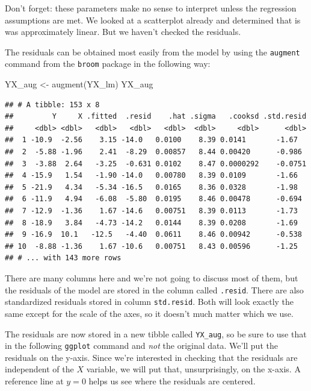 \documentclass[
]{book}
\newenvironment{Shaded}{\begin{snugshade}}{\end{snugshade}}
\newcommand{\FunctionTok}[1]{\textcolor[rgb]{0.00,0.00,0.00}{#1}}
\newcommand{\NormalTok}[1]{#1}
\newcommand{\OtherTok}[1]{\textcolor[rgb]{0.56,0.35,0.01}{#1}}
\begin{document}
Don't forget: these parameters make no sense to interpret unless the regression assumptions are met. We looked at a scatterplot already and determined that is was approximately linear. But we haven't checked the residuals.

The residuals can be obtained most easily from the model by using the \texttt{augment} command from the \texttt{broom} package in the following way:

\begin{Shaded}
\begin{Highlighting}[]
\NormalTok{YX\_aug }\OtherTok{\textless{}{-}} \FunctionTok{augment}\NormalTok{(YX\_lm)}
\NormalTok{YX\_aug}
\end{Highlighting}
\end{Shaded}

\begin{verbatim}
## # A tibble: 153 x 8
##         Y     X .fitted  .resid    .hat .sigma   .cooksd .std.resid
##     <dbl> <dbl>   <dbl>   <dbl>   <dbl>  <dbl>     <dbl>      <dbl>
##  1 -10.9  -2.56    3.15 -14.0   0.0100    8.39 0.0141       -1.67  
##  2  -5.88 -1.96    2.41  -8.29  0.00857   8.44 0.00420      -0.986 
##  3  -3.88  2.64   -3.25  -0.631 0.0102    8.47 0.0000292    -0.0751
##  4 -15.9   1.54   -1.90 -14.0   0.00780   8.39 0.0109       -1.66  
##  5 -21.9   4.34   -5.34 -16.5   0.0165    8.36 0.0328       -1.98  
##  6 -11.9   4.94   -6.08  -5.80  0.0195    8.46 0.00478      -0.694 
##  7 -12.9  -1.36    1.67 -14.6   0.00751   8.39 0.0113       -1.73  
##  8 -18.9   3.84   -4.73 -14.2   0.0144    8.39 0.0208       -1.69  
##  9 -16.9  10.1   -12.5   -4.40  0.0611    8.46 0.00942      -0.538 
## 10  -8.88 -1.36    1.67 -10.6   0.00751   8.43 0.00596      -1.25  
## # ... with 143 more rows
\end{verbatim}

There are many columns here and we're not going to discuss most of them, but the residuals of the model are stored in the column called \texttt{.resid}. There are also standardized residuals stored in column \texttt{std.resid}. Both will look exactly the same except for the scale of the axes, so it doesn't much matter which we use.

The residuals are now stored in a new tibble called \texttt{YX\_aug}, so be sure to use that in the following \texttt{ggplot} command and \emph{not} the original data. We'll put the residuals on the y-axis. Since we're interested in checking that the residuals are independent of the \(X\) variable, we will put that, unsurprisingly, on the x-axis. A reference line at \(y = 0\) helps us see where the residuals are centered.
\end{document}
